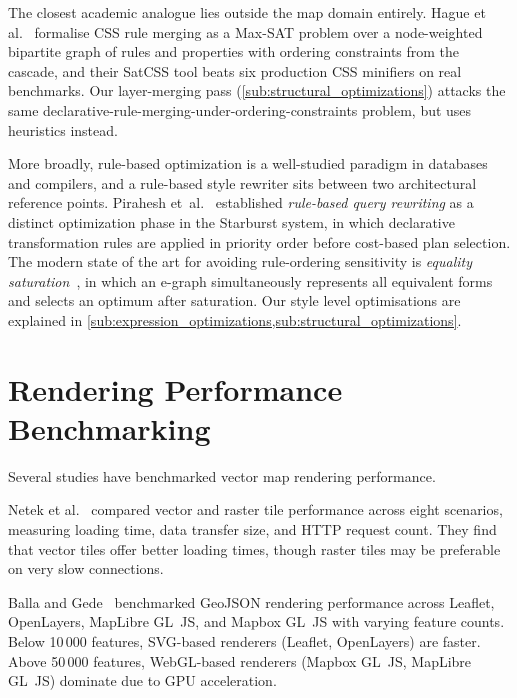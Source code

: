 The closest academic analogue lies outside the map domain entirely.
Hague et al.~\cite{hagueCSSMinificationConstraint2019} formalise \ac{CSS} rule merging as a Max-SAT problem over a node-weighted bipartite graph of rules and properties with ordering constraints from the cascade, and their SatCSS tool beats six production \ac{CSS} minifiers on real benchmarks.
Our layer-merging pass (\cref{sub:structural_optimizations}) attacks the same declarative-rule-merging-under-ordering-constraints problem, but uses heuristics instead.

More broadly, rule-based optimization is a well-studied paradigm in databases and compilers, and a rule-based style rewriter sits between two architectural reference points.
Pirahesh et~al.~\cite{piraheshExtensibleRuleBased1992} established \emph{rule-based query rewriting} as a distinct optimization phase in the Starburst system, in which declarative transformation rules are applied in priority order before cost-based plan selection.
The modern state of the art for avoiding rule-ordering sensitivity is \emph{equality saturation}~\cite{tateEqualitySaturationNew2009,willseyEggFastExtensible2021}, in which an e-graph simultaneously represents all equivalent forms and selects an optimum after saturation.
Our style level optimisations are explained in \cref{sub:expression_optimizations,sub:structural_optimizations}.

\section{Rendering Performance Benchmarking}\label{sec:rw_benchmarking}

Several studies have benchmarked vector map rendering performance.

Netek et al.~\cite{netekPerformanceTestingVector2020} compared vector and raster tile performance across eight scenarios, measuring loading time, data transfer size, and \ac{HTTP} request count.
They find that vector tiles offer better loading times, though raster tiles may be preferable on very slow connections.

Balla and Gede~\cite{ballaVectorDataRendering2025} benchmarked \ac{GeoJSON} rendering performance across Leaflet, OpenLayers, MapLibre GL~JS, and Mapbox GL~JS with varying feature counts.
Below 10\,000 features, \ac{SVG}-based renderers (Leaflet, OpenLayers) are faster.
Above 50\,000 features, \ac{WebGL}-based renderers (Mapbox GL~JS, MapLibre GL~JS) dominate due to \ac{GPU} acceleration.

